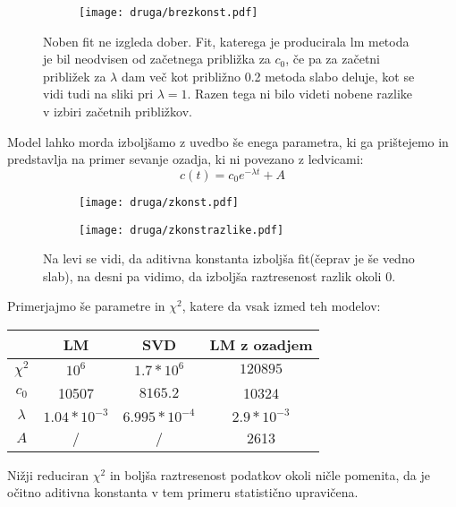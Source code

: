 \documentclass{article}
\begin{document}
\begin{figure}[H]
\centering
\begin{subfigure}{.49\textwidth}
\texttt{[image: druga/brezkonst.pdf]}
\end{subfigure}
\caption*{Noben fit ne izgleda dober. Fit, katerega je producirala lm metoda je bil neodvisen od začetnega približka za $c_0$, če pa za začetni približek za $\lambda$ dam več kot približno 0.2 metoda slabo deluje, kot se vidi tudi na sliki pri $\lambda=1$. Razen tega ni bilo videti nobene razlike v izbiri začetnih približkov.}
\end{figure}

Model lahko morda izboljšamo z uvedbo še enega parametra, ki ga prištejemo in predstavlja na primer sevanje ozadja, ki ni povezano z ledvicami:
\begin{equation*}
c(t) = c_0 e^{-\lambda t} + A
\end{equation*}

\begin{figure}[H]
\centering
\begin{subfigure}{.49\textwidth}
\texttt{[image: druga/zkonst.pdf]}
\end{subfigure}
\begin{subfigure}{.49\textwidth}
\texttt{[image: druga/zkonstrazlike.pdf]}
\end{subfigure}
\caption*{Na levi se vidi, da aditivna konstanta izboljša fit(čeprav je še vedno slab), na desni pa vidimo, da izboljša raztresenost razlik okoli 0.}
\end{figure}

Primerjajmo še parametre in $\chi^2$, katere da vsak izmed teh modelov:
\begin{center}
\begin{tabular}{|c|c|c|c|}
\hline
& LM & SVD & LM z ozadjem\\ \hline
$\chi^2$ & $10^{6}$ & $1.7*10^6$ & $120895$\\ \hline
$c_0$ & 10507& $8165.2$ & 10324\\ \hline
$\lambda$ & $1.04*10^{-3}$ &$6.995*10^{-4}$ & $2.9*10^{-3}$\\ \hline
$A$ & / & / & 2613\\ \hline
\end{tabular}
\end{center}

Nižji reduciran $\chi^2$ in boljša raztresenost podatkov okoli ničle pomenita, da je očitno aditivna konstanta v tem primeru  statistično upravičena.
\end{document}
